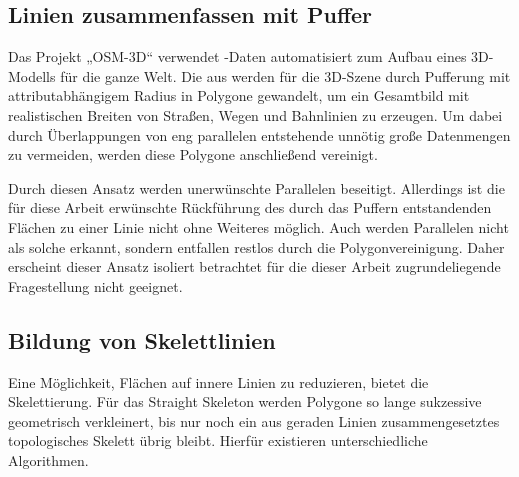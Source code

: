 \documentclass[../main/thesis.tex]{subfiles}
\begin{document}
\subsection{Linien zusammenfassen mit Puffer} \label{buffer}

Das Projekt „OSM-3D“ verwendet \osm-Daten automatisiert zum Aufbau eines 3D-Modells für die ganze Welt.
Die  aus \osm{} werden für die 3D-Szene durch Pufferung mit attributabhängigem Radius in Polygone gewandelt, um ein Gesamtbild mit realistischen Breiten von Straßen, Wegen und Bahnlinien zu erzeugen.
Um dabei durch Überlappungen von eng parallelen  entstehende unnötig große Datenmengen zu vermeiden, werden diese Polygone anschließend vereinigt. 

Durch diesen Ansatz werden unerwünschte Parallelen beseitigt.
Allerdings ist die für diese Arbeit erwünschte Rückführung des durch das Puffern entstandenden Flächen zu einer Linie nicht ohne Weiteres möglich.
Auch werden Parallelen nicht als solche erkannt, sondern entfallen restlos durch die Polygonvereinigung.
Daher erscheint dieser Ansatz isoliert betrachtet für die dieser Arbeit zugrundeliegende Fragestellung nicht geeignet.


\subsection{Bildung von Skelettlinien}

Eine Möglichkeit, Flächen auf innere Linien zu reduzieren, bietet die Skelettierung.
Für das Straight Skeleton werden Polygone so lange sukzessive geometrisch verkleinert, bis nur noch ein aus geraden Linien zusammengesetztes topologisches Skelett übrig bleibt.
Hierfür existieren unterschiedliche Algorithmen. 
\end{document}
